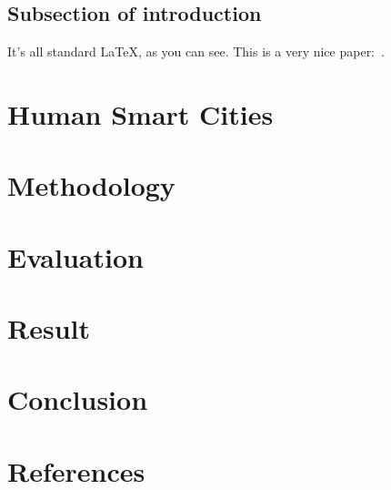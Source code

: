 \documentclass[a4paper,12pt]{article}
\begin{document}
\subsection{Subsection of introduction}
It's all standard \LaTeX, as you can see.
This is a very nice paper:~\cite{zadeh}.

\section{Human Smart Cities} %

\section{Methodology} %

\section{Evaluation} %


\section {Result} %


\section{Conclusion} %


\section{References}



\end{document}

